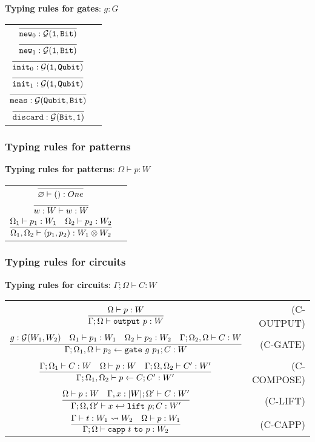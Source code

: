 \noindent \textbf{Typing rules for gates}: $\boxed{g : G}$
\renewcommand\arraystretch{2.5}
\begin{longtable}[c]{cr}
  $ \infer{\new_0 : \calG(\One, \Bit)}{}$ & \\
  $ \infer{\new_1 : \calG(\One, \Bit)}{}$ & \\
  $ \infer{\init_0 : \calG(\One, \Qubit)}{}$ & \\
  $ \infer{\init_1 : \calG(\One, \Qubit)}{}$ & \\
  $ \infer{\meas : \calG(\Qubit, \Bit)}{}$ & \\
  $ \infer{\discard : \calG(\Bit, \One)}{}$ & \\
\end{longtable}

\subsubsection{Typing rules for patterns}

\noindent \textbf{Typing rules for patterns}: $\boxed{\Omega \vdash p : W}$

\renewcommand\arraystretch{2.5}
\begin{longtable}[c]{cr}
  $ \infer{\varnothing \vdash ():One}{}$ & \\
  $ \infer{w:W \vdash w:W}{}$ & \\
  $ \infer{\Omega_1, \Omega_2 \vdash (p_1,p_2):W_1\otimes W_2}{\Omega_1 \vdash p_1 : W_1  &\Omega_2 \vdash p_2 : W_2} $ & \\
\end{longtable}

\subsubsection{Typing rules for circuits}

\noindent \textbf{Typing rules for circuits}: $\boxed{\Gamma;\Omega\vdash C:W}$


\renewcommand\arraystretch{3} 
\begin{longtable}[c]{cr}
  $\infer{\Gamma;\Omega\vdash \toutput\ p:W}{\Omega\vdash p : W}$ &(C-OUTPUT)\\
  $\infer{\Gamma;\Omega_1,\Omega\vdash p_2 \from \gate\ g\ p_1 ; C:W}{g:\calG(W_1, W_2) &\Omega_1\vdash p_1:W_1 &\Omega_2\vdash p_2:W_2 &\Gamma ; \Omega_2,\Omega \vdash C:W}$ &(C-GATE)\\
  $\infer{\Gamma;\Omega_1,\Omega_2\vdash p \from C ; C':W'}{\Gamma;\Omega_1\vdash C:W &\Omega \vdash p:W &\Gamma;\Omega,\Omega_2 \vdash C':W'}$ &(C-COMPOSE)\\
  $\infer{\Gamma;\Omega,\Omega'\vdash x \hookleftarrow \lift\ p ; C:W'}{\Omega\vdash p:W &\Gamma,x:|W|;\Omega' \vdash C:W'}$ &(C-LIFT)\\
  $\infer{\Gamma;\Omega\vdash \capp\ t\ \mathtt{to}\ p : W_2}{\Gamma\vdash t:W_1\leadsto W_2 &\Omega\vdash p:W_1}$ &(C-CAPP)\\
  
\end{longtable}

